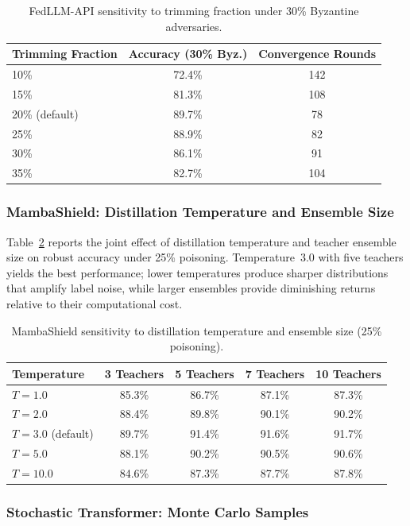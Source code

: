 \begin{table}[htbp]
\centering
\caption{FedLLM-API sensitivity to trimming fraction under 30\% Byzantine adversaries.}
\label{tab:app_sens_trim}
\begin{tabular}{lcc}
\toprule
Trimming Fraction & Accuracy (30\% Byz.) & Convergence Rounds \\
\midrule
10\% & 72.4\% & 142 \\
15\% & 81.3\% & 108 \\
20\% (default) & 89.7\% & 78 \\
25\% & 88.9\% & 82 \\
30\% & 86.1\% & 91 \\
35\% & 82.7\% & 104 \\
\bottomrule
\end{tabular}
\end{table}


\subsubsection{MambaShield: Distillation Temperature and Ensemble Size}

Table~\ref{tab:app_sens_mamba} reports the joint effect of distillation temperature and teacher ensemble size on robust accuracy under 25\% poisoning. Temperature~3.0 with five teachers yields the best performance; lower temperatures produce sharper distributions that amplify label noise, while larger ensembles provide diminishing returns relative to their computational cost.

\begin{table}[htbp]
\centering
\caption{MambaShield sensitivity to distillation temperature and ensemble size (25\% poisoning).}
\label{tab:app_sens_mamba}
\begin{tabular}{lcccc}
\toprule
Temperature & 3 Teachers & 5 Teachers & 7 Teachers & 10 Teachers \\
\midrule
$T=1.0$ & 85.3\% & 86.7\% & 87.1\% & 87.3\% \\
$T=2.0$ & 88.4\% & 89.8\% & 90.1\% & 90.2\% \\
$T=3.0$ (default) & 89.7\% & 91.4\% & 91.6\% & 91.7\% \\
$T=5.0$ & 88.1\% & 90.2\% & 90.5\% & 90.6\% \\
$T=10.0$ & 84.6\% & 87.3\% & 87.7\% & 87.8\% \\
\bottomrule
\end{tabular}
\end{table}


\subsubsection{Stochastic Transformer: Monte Carlo Samples}

